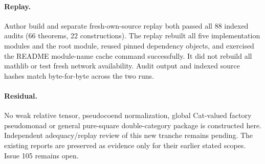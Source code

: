 \documentclass{article}
\begin{document}
\paragraph{Replay.} Author build and separate fresh-own-source replay both passed all 88 indexed audits (66 theorems, 22 constructions). The replay rebuilt all five implementation modules and the root module, reused pinned dependency objects, and exercised the README module-name cache command successfully. It did not rebuild all mathlib or test fresh network availability. Audit output and indexed source hashes match byte-for-byte across the two runs.
\paragraph{Residual.} No weak relative tensor, pseudocoend normalization, global Cat-valued factory pseudomonad or general pure-square double-category package is constructed here. Independent adequacy/replay review of this new tranche remains pending. The existing reports are preserved as evidence only for their earlier stated scopes. Issue 105 remains open.
\end{document}
